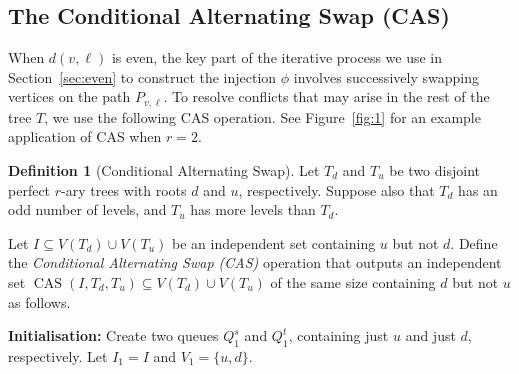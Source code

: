 \documentclass[11pt]{article}
\theoremstyle{definition}
\newtheorem{definition}[theorem]{Definition}
\DeclareMathOperator{\cas}{CAS}
\begin{document}
\subsection{The Conditional Alternating Swap (CAS)}\label{sec:cas}
When $d(v,\ell)$ is even, the key part of the iterative process we use in Section~\ref{sec:even} to construct the injection $\phi$ involves successively swapping vertices on the path $P_{v,\ell}$. To resolve conflicts that may arise in the rest of the tree $T$, we use the following CAS operation. See Figure~\ref{fig:1} for an example application of CAS when $r=2$.  
\begin{definition}[Conditional Alternating Swap]\label{def:CAS}
Let $T_d$ and $T_u$ be two disjoint perfect $r$-ary trees with roots $d$ and $u$, respectively. Suppose also that $T_d$ has an odd number of levels, and $T_u$ has more levels than $T_d$.

Let $I\subseteq V(T_d)\cup V(T_u)$ be an independent set containing $u$ but not $d$. Define the \textit{Conditional Alternating Swap (CAS)} operation that outputs an independent set $\cas(I,T_d,T_u)\subseteq V(T_d)\cup V(T_u)$ of the same size containing $d$ but not $u$ as follows.

\medskip

\noindent\textbf{Initialisation:} Create two queues $Q_1^s$ and $Q_1^t$, containing just $u$ and just $d$, respectively. Let $I_1=I$ and $V_1=\{u,d\}$.

\medskip


\end{definition}
\end{document}
